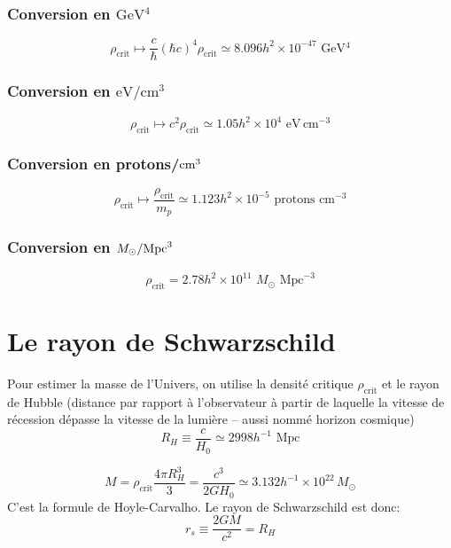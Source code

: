 \documentclass{article}
\numberwithin{equation}{section}
\begin{document}
\subsubsection{Conversion en $\si{\giga \electronvolt^{4}}$}
\[
        \rho_{\text{crit}} \mapsto \frac{c}{\hbar} (\hbar c)^4 \rho_{\text{crit}}
        \simeq 8.096 h^2 \times 10^{-47}\,\, \si{\giga\electronvolt^{4}}
\]

\subsubsection{Conversion en $\si{\electronvolt \per \centi\meter^{3}}$}
\[
        \rho_{\text{crit}} \mapsto c^2 \rho_{\text{crit}} \simeq 1.05 h^2 \times 10^{4}\,\, 
        \si{\electronvolt}\, \text{cm}^{-3}
\]

\subsubsection{Conversion en \textmd{protons}/$\textmd{cm}^{3}$}
\[
        \rho_{\text{crit}} \mapsto \frac{\rho_{\text{crit}}}{m_p} \simeq 
        1.123h^2\times 10^{-5}\,\, \text{protons}\,\,\text{cm}^{-3}
\]

\subsubsection{Conversion en $M_\odot / \textmd{Mpc}^{3}$}
\[
        \rho_{\text{crit}} = 2.78h^2 \times 10^{11}\,\, M_\odot\,\, \text{Mpc}^{-3}
\]


\section{Le rayon de Schwarzschild}
Pour estimer la masse de l'Univers, on utilise la densité critique $\rho_{\text{crit}}$ 
et le rayon de Hubble (distance par rapport à l'observateur à partir de laquelle 
la vitesse de récession dépasse la vitesse de la lumière -- aussi nommé horizon cosmique)
\[
        R_H \equiv \frac{c}{H_0} \simeq 2998h^{-1}\,\, \text{Mpc}
\]

\[
        M =  \rho_{\text{crit}} \frac{4 \pi R_H^{3}}{3} = \frac{c^3}{2GH_0} 
       \simeq 3.132  h^{-1} \times 10^{22}\, M_\odot
\]
C'est la formule de Hoyle-Carvalho.
Le rayon de Schwarzschild est donc:
\[
        r_s \equiv \frac{2 G M}{c^2} =  R_H
\]
\end{document}
